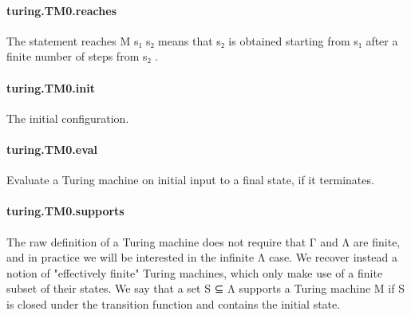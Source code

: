 \documentclass{article}
\begin{document}
\paragraph{turing.TM0.reaches}
\par
The statement 
\colorbox[RGB]{253,246,227}{{{{\color[RGB]{101, 123, 131} reaches M s₁ s₂ }}}} means that 
\colorbox[RGB]{253,246,227}{{{{\color[RGB]{101, 123, 131} s₂ }}}} is obtained
starting from 
\colorbox[RGB]{253,246,227}{{{{\color[RGB]{101, 123, 131} s₁ }}}} after a finite number of steps from 
\colorbox[RGB]{253,246,227}{{{{\color[RGB]{101, 123, 131} s₂ }}}}.
\paragraph{turing.TM0.init}
\par
The initial configuration.
\paragraph{turing.TM0.eval}
\par
Evaluate a Turing machine on initial input to a final state,
if it terminates.
\paragraph{turing.TM0.supports}
\par
The raw definition of a Turing machine does not require that
\colorbox[RGB]{253,246,227}{{{{\color[RGB]{101, 123, 131} Γ }}}} and 
\colorbox[RGB]{253,246,227}{{{{\color[RGB]{101, 123, 131} Λ }}}} are finite, and in practice we will be interested
in the infinite 
\colorbox[RGB]{253,246,227}{{{{\color[RGB]{101, 123, 131} Λ }}}} case. We recover instead a notion of
"effectively finite" Turing machines, which only make use of a
finite subset of their states. We say that a set 
\colorbox[RGB]{253,246,227}{{{{\color[RGB]{101, 123, 131} S ⊆ Λ }}}}supports a Turing machine 
\colorbox[RGB]{253,246,227}{{{{\color[RGB]{101, 123, 131} M }}}} if 
\colorbox[RGB]{253,246,227}{{{{\color[RGB]{101, 123, 131} S }}}} is closed under the
transition function and contains the initial state.
\end{document}
